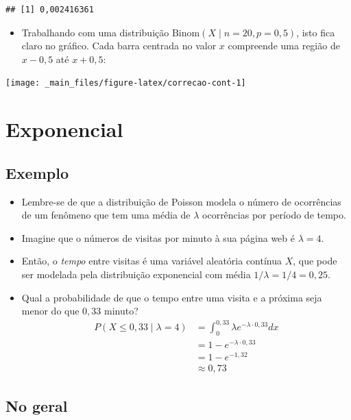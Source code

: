 \documentclass[
  11pt]{report}
\providecommand{\tightlist}{%
  \setlength{\itemsep}{0pt}\setlength{\parskip}{0pt}}
\begin{document}
\begin{verbatim}
## [1] 0,002416361
\end{verbatim}

\begin{itemize}
\tightlist
\item
  Trabalhando com uma distribuição $\text{Binom}(X \mid n = 20, p = 0{,}5)$, isto fica claro no gráfico. Cada barra centrada no valor $x$ compreende uma região de $x - 0{,}5$ até $x + 0{,}5$:
\end{itemize}

\begin{center}\texttt{[image: \_main\_files/figure-latex/correcao-cont-1]} \end{center}

\hypertarget{exponencial}{%
\section{Exponencial}\label{exponencial}}

\hypertarget{exemplo-7}{%
\subsection{Exemplo}\label{exemplo-7}}

\begin{itemize}
\item
  Lembre-se de que a distribuição de Poisson modela o número de ocorrências de um fenômeno que tem uma média de $\lambda$ ocorrências por período de tempo.
\item
  Imagine que o números de visitas por minuto à sua página web é $\lambda = 4$.
\item
  Então, o \emph{tempo} entre visitas é uma variável aleatória contínua $X$, que pode ser modelada pela distribuição exponencial com média $1/\lambda = 1/4 = 0{,}25$.
\item
  Qual a probabilidade de que o tempo entre uma visita e a próxima seja menor do que $0{,}33$ minuto?
  \[
  \begin{aligned}
  P(X \leq 0{,}33 \mid \lambda = 4) 
    &= \int_0^{0{,}33} \lambda e^{-\lambda \cdot 0{,}33} dx \\
    &= 1 - e^{-\lambda \cdot 0{,}33} \\
    &= 1 - e^{-1{,}32} \\
    &\approx 0{,}73
  \end{aligned}
  \]
\end{itemize}

\hypertarget{no-geral-8}{%
\subsection{No geral}\label{no-geral-8}}
\end{document}
